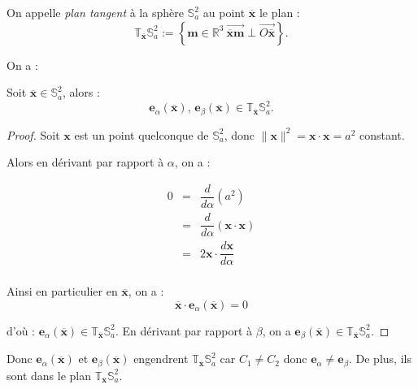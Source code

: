 \begin{definition}
On appelle \textit{plan tangent} à la sphère $\mathbb{S}_a^2$ au point $\overline{\mathbf{x}}$ le plan :
\begin{equation}
\mathbb{T}_{\overline{\mathbf{x}}} \mathbb{S}_a^2 := \left\lbrace \mathbf{m} \in \mathbb{R}^3 \ \overrightarrow{\overline{\mathbf{x}} \mathbf{m}} \perp \overrightarrow{O\mathbf{\overline{x}}} \right\rbrace.
\end{equation}
\end{definition}

On a :

\begin{proposition}
Soit $\overline{\mathbf{x}} \in \mathbb{S}_a^2$, alors :
\begin{equation}
\mathbf{e}_{\alpha}(\overline{\mathbf{x}})\text{, } \mathbf{e}_{\beta}(\overline{\mathbf{x}}) \in \mathbb{T}_{\overline{\mathbf{x}}} \mathbb{S}_a^2.
\end{equation}
\end{proposition}


\begin{proof}
 Soit $\mathbf{x}$ est un point quelconque de $\mathbb{S}_a^2$, donc $\| \mathbf{x} \|^2 = \mathbf{x} \cdot \mathbf{x} = a^2$ constant.
 
Alors en dérivant par rapport à $\alpha$, on a :
 
\begin{equation*}
\begin{array}{rcl}
0 & = & \dfrac{d}{d \alpha} ( a^2 )\\
  & = & \dfrac{d}{d \alpha} ( \mathbf{x} \cdot \mathbf{x} )\\
  & = & 2 \mathbf{x} \cdot \dfrac{d \mathbf{x}}{d \alpha}\\
\end{array}
\end{equation*}

Ainsi en particulier en $\overline{\mathbf{x}}$, on a :
\begin{equation}
\overline{\mathbf{x}} \cdot \mathbf{e}_{\alpha}(\overline{\mathbf{x}}) = 0
\end{equation}

d'où : $\mathbf{e}_{\alpha}(\overline{\mathbf{x}}) \in \mathbb{T}_{\overline{\mathbf{x}}} \mathbb{S}_a^2$. En dérivant par rapport à $\beta$, on a $\mathbf{e}_{\beta}(\overline{\mathbf{x}}) \in \mathbb{T}_{\overline{\mathbf{x}}} \mathbb{S}_a^2$.
\end{proof}

Donc $\mathbf{e}_{\alpha}(\overline{\mathbf{x}})$ et $\mathbf{e}_{\beta}(\overline{\mathbf{x}})$ engendrent $\mathbb{T}_{\overline{\mathbf{x}}}\mathbb{S}_a^2$ car $C_1 \neq C_2$ donc $\mathbf{e}_{\alpha} \neq \mathbf{e}_{\beta}$. De plus, ils sont dans le plan $\mathbb{T}_{\overline{\mathbf{x}}}\mathbb{S}_a^2$.

